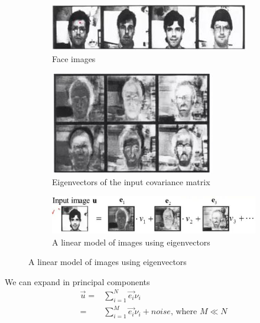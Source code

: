 \documentclass[]{article}
\begin{document}
\begin{figure}[H]
	\begin{center}
		\caption[Eigenfaces]{Eigenfaces\cite{turk1991eigenfaces}}
		\begin{subfigure}[t]{0.9\textwidth}
			\caption{Face images}
			\includegraphics[width=\textwidth]{eigenfaces1}
		\end{subfigure}
		\begin{subfigure}[t]{0.9\textwidth}
			\caption{Eigenvectors of the input covariance matrix}
			\includegraphics[width=\textwidth]{eigenfaces2}
		\end{subfigure}
		\begin{subfigure}[t]{0.9\textwidth}
			\caption{A linear model of images using eigenvectors}
			\includegraphics[width=\textwidth]{eigenfaces3}
		\end{subfigure}
	\end{center}
\end{figure}

We can expand in principal components
\begin{align*}
	\vec{u} =& \sum_{i=1}^{N} \vec{e_i} \nu_i \\
	=& \sum_{i=1}^{M} \vec{e_i} \nu_i + noise \text{, where $M\ll N$}
\end{align*}
\end{document}
